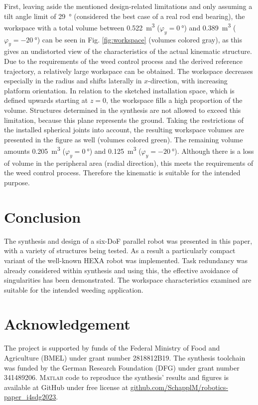 \documentclass[runningheads,hidelinks]{llncs}
\begin{document}
First, leaving aside the mentioned design-related limitations and only assuming a tilt angle limit of \SI{29}{\degree} (considered the best case of a real rod end bearing), the workspace with a total volume between \SI{0.522}{\cubic\metre} ($\varphi_y = \SI{0}{\degree}$) and \SI{0.389}{\cubic\metre} ($\varphi_y = \SI{-20}{\degree}$) can be seen in Fig. \ref{fig:workspace} (volumes colored gray), as this gives an undistorted view of the characteristics of the actual kinematic structure.
Due to the requirements of the weed control process and the derived reference trajectory, a relatively large workspace can be obtained.
The workspace decreases especially in the radius and shifts laterally in $x$-direction, with increasing platform orientation. 
In relation to the sketched installation space, which is defined upwards starting at $z=0$, the workspace fills a high proportion of the volume. 
Structures determined in the synthesis are not allowed to exceed this limitation, because this plane represents the ground.
Taking the restrictions of the installed spherical joints into account, the resulting workspace volumes are presented in the figure as well (volumes colored green). 
The remaining volume amounts \SI{0.205}{\cubic\metre} ($\varphi_y = \SI{0}{\degree}$) and \SI{0.125}{\cubic\metre} ($\varphi_y = \SI{-20}{\degree}$). 
Although there is a loss of volume in the peripheral area (radial direction), this meets the requirements of the weed control process. Therefore the kinematic is suitable for the intended purpose. 

\section{Conclusion}
The synthesis and design of a six-DoF parallel robot was presented in this paper, with a variety of structures being tested. As a result a particularly compact variant of the well-known \textsc{HEXA} robot was implemented. Task redundancy was already considered within synthesis and using this, the effective avoidance of singularities has been demonstrated. The workspace characteristics examined are suitable for the intended weeding application. 
%
\section*{Acknowledgement}
The project is supported by funds of the Federal Ministry of Food and Agriculture (BMEL) under grant number 2818812B19. 
The synthesis toolchain was funded by the German Research Foundation (DFG) under grant number 341489206.
\textsc{Matlab} code to reproduce the synthesis' results and figures is available at GitHub under free license at \url{github.com/SchapplM/robotics-paper_i4sdg2023}.

% 


\end{document}
